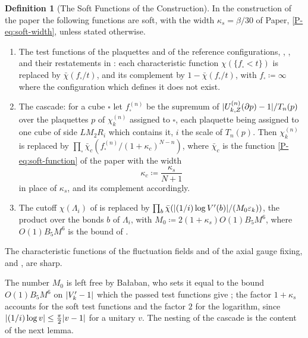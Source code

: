 \documentclass[11pt]{preprint}
\DeclarePairedDelimiter{\abs}{\lvert}{\rvert}
\numberwithin{equation}{section}
\theoremstyle{definition}
\newtheorem{definition}[lemma]{Definition}
\theoremstyle{remark}
\theoremstyle{plain}
\begin{document}
\begin{definition}[The Soft Functions of the Construction]\label{def:soft-functions}
In the construction of the paper the following functions are soft, with the width $\kappa_s = \beta/30$ of Paper, \eqref{P-eq:soft-width}, unless stated otherwise.
\begin{enumerate}[label=(\roman*)]
\item The test functions of the plaquettes and of the reference configurations, \cite[(1.1), (1.4), (1.8), (2.17), (3.2), (3.3)]{BalabanCRE}, \cite[(1.3), (1.4), (1.7), (1.8), (1.27), (1.75), (1.88)]{BalabanLFR1}, and their restatements in \cite[(1.70), p.~380]{BalabanLFR2}: each characteristic function $\chi(\{ f_\square < t \})$ is replaced by $\bar\chi(f_\square/t)$, and its complement by $1 - \bar\chi(f_\square/t)$, with $f_\square \coloneqq \infty$ where the configuration which defines it does not exist.
\item The cascade: for a cube $\square$ let $f^{(n)}_\square$ be the supremum of $\abs{U^{(n)}_{k,Z}(\partial p) - 1}/T_n(p)$ over the plaquettes $p$ of $\chi_k^{(n)}$ assigned to $\square$, each plaquette being assigned to one cube of side $LM_2R_i$ which contains it, $i$ the scale of $T_n(p)$. Then $\chi_k^{(n)}$ is replaced by $\prod_\square\bar\chi_c(f^{(n)}_\square/(1 + \kappa_c)^{N-n})$, where $\bar\chi_c$ is the function \eqref{P-eq:soft-function} of the paper with the width
\begin{equation}\label{eq:cascade-width}
    \kappa_c \coloneqq \frac{\kappa_s}{N + 1}
\end{equation}
in place of $\kappa_s$, and its complement accordingly.
\item The cutoff $\chi(\Lambda_i)$ of \cite[(1.101), p.~201]{BalabanLFR1} is replaced by $\prod_b\bar\chi(\abs{(1/i)\log V'(b)}/(M_0\varepsilon_k))$, the product over the bonds $b$ of $\Lambda_i$, with $M_0 \coloneqq 2(1 + \kappa_s)O(1)B_5M^6$, where $O(1)B_5M^6$ is the bound of \cite[p.~378]{BalabanLFR2}.
\end{enumerate}
The characteristic functions of the fluctuation fields and of the axial gauge fixing, \cite[(1.5), (1.18), (3.16)]{BalabanCRE} and \cite[(1.5), (1.9), (1.55), (1.82)]{BalabanLFR1}, are sharp.
\end{definition}

The number $M_0$ is left free by Ba{\l}aban, who sets it equal to the bound $O(1)B_5M^6$ on $\abs{V'_k - 1}$ which the passed test functions give \cite[p.~378]{BalabanLFR2}; the factor $1 + \kappa_s$ accounts for the soft test functions and the factor $2$ for the logarithm, since $\abs{(1/i)\log v} \leq \frac{\pi}{2}\abs{v - 1}$ for a unitary $v$. The nesting of the cascade is the content of the next lemma.
\end{document}
